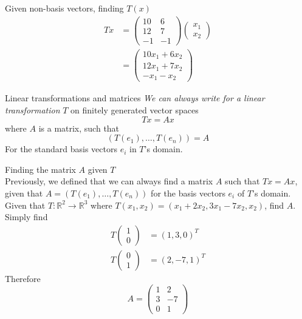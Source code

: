 \documentclass[journal, letterpaper]{IEEEtran}
\begin{document}
\begin{myboxg}{Given non-basis vectors, finding $T(x)$}
        \begin{align*}
            Tx &= \begin{pmatrix}
                10 & 6 \\ 12 & 7 \\ -1 & -1
            \end{pmatrix}\begin{pmatrix}
                x_1 \\ x_2
            \end{pmatrix} \\
            &= \begin{pmatrix}
                10x_1 + 6x_2 \\ 
                12x_1 + 7x_2 \\ 
                -x_1 - x_2
            \end{pmatrix}
        \end{align*}
    \end{myboxg}
    \begin{myboxr}{Linear transformations and matrices}
        \textit{We can always write for a linear transformation} $T$ on finitely generated vector spaces
        $$ Tx = Ax$$
        where $A$ is a matrix, such that
        $$ (T(e_1), \dots, T(e_n)) = A$$
        For the standard basis vectors $e_i$ in $T$'s domain.
    \end{myboxr}
    \begin{myboxg}{Finding the matrix $A$ given $T$} \\ 
        Previously, we defined that we can always find a matrix $A$ such that $Tx = Ax$, given that $A = (T(e_1), \dots, T(e_n))$ for the basis vectors $e_i$ of $T$'s domain.
        \newline \\ 
        Given that $T : \mathbb{R}^2 \to \mathbb{R}^3$ where $T(x_1, x_2) = (x_1 + 2x_2, 3x_1 - 7x_2, x_2)$, find $A$.
        \newline \\ 
        Simply find
        \begin{align*}
            T\begin{pmatrix}
                1 \\ 0
            \end{pmatrix} &= (1, 3, 0)^T \\
            T\begin{pmatrix}
                0 \\ 1
            \end{pmatrix} &= (2, -7, 1)^T
        \end{align*}
        Therefore 
        $$ A = \begin{pmatrix}
            1 & 2 \\ 3 & -7 \\ 0 & 1
        \end{pmatrix}$$
    \end{myboxg}
\end{document}

